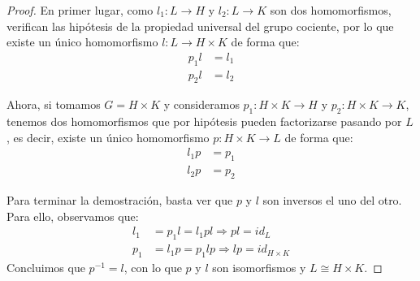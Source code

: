\begin{teo}
   \begin{proof}
       En primer lugar, como $l_1:L\to H$ y $l_2:L\to K$ son dos homomorfismos, verifican las hipótesis de la propiedad universal del grupo cociente, por lo que existe un único homomorfismo $l:L\to H\times K$ de forma que:
       \begin{align*}
           p_1l &= l_1 \\
           p_2l &= l_2
       \end{align*}
       \begin{figure}[H]
           \centering
       \end{figure}
       Ahora, si tomamos $G = H\times K$ y consideramos $p_1:H\times K\to H$ y $p_2:H\times K\to K$, tenemos dos homomorfismos que por hipótesis pueden factorizarse pasando por $L$, es decir, existe un único homomorfismo $p:H\times K\to L$ de forma que:
       \begin{align*}
           l_1p &= p_1 \\
           l_2p &= p_2
       \end{align*}
       \begin{figure}[H]
           \centering
       \end{figure}
       \noindent
       Para terminar la demostración, basta ver que $p$ y $l$ son inversos el uno del otro. Para ello, observamos que:
       \begin{align*}
           l_1 &= p_1l = l_1pl \Longrightarrow pl = id_{L} \\
           p_1 &= l_1p = p_1lp \Longrightarrow lp = id_{H\times K}
       \end{align*}
       Concluimos que $p^{-1} = l$, con lo que $p$ y $l$ son isomorfismos y $L\cong H\times K$.
   \end{proof}
\end{teo}

